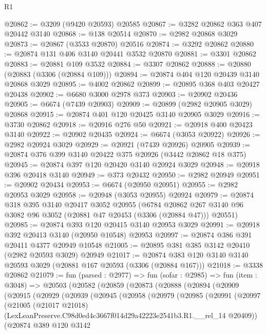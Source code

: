 \begin{lexlean}{R1}
\begin{coremodule}
@20862 := @3209 (@9420 @20593) @20585
@20867 := @3282 @20862 @363 @407 @20442 @3140
@20868 := @138 @20514
@20870 := @2982 @20868 @3029
@20873 := @20867 (@3533 @20870) @20516
@20874 := @3292 @20862
@20880 := @20874 @131 @406 @3140 @20441 @3532 @20870
@20881 := @3301 @20862
@20883 := @20881 @109 @3532
@20884 := @3307 @20862
@20888 := @20880 (@20883 (@3306 (@20884 @109)))
@20894 := @20874 @404 @120 @20439 @3140 @20868 @3029
@20895 := @4002 @20862
@20899 := @20895 @368 @403 @20427 @20438
@20902 := @6680 @3000 @2978 @373
@20903 := @20902 @20436
@20905 := @6674 (@7439 @20903)
@20909 := @20899 (@2982 @20905 @3029) @20868
@20915 := @20874 @401 @120 @20425 @3140 @20905 @3029
@20916 := @3730 @20862
@20918 := @20916 @276 @50
@20921 := @20918 @400 @20423 @3140
@20922 := @20902 @20435
@20924 := @6674 (@3053 @20922)
@20926 := @2982 @20924 @3029
@20929 := @20921 (@7439 @20926) @20905
@20939 := @20874 @376 @399 @3140 @20422 @375 @20926 (@3442 @20862 @18 @375)
@20945 := @20874 @397 @120 @20420 @3140 @20924 @3029
@20948 := @20918 @396 @20418 @3140
@20949 := @373 @20432
@20950 := @2982 @20949
@20951 := @20902 @20434
@20953 := @6674 (@20950 @20951)
@20955 := @2982 @20953 @3029
@20958 := @20948 (@3053 @20955) @20924
@20979 := @20874
    @318
    @395
    @3140
    @20417
    @3052
    @20955
    (@6784 @20862 @267 @3140 @96 @3082 @96 @3052 (@20881 @47 @20453 (@3306 (@20884 @47))) @20551)
@20985 := @20874 @393 @120 @20415 @3140 @20953 @3029
@20991 := @20918 @392 @20413 @3140 (@20950 @10548) @20953
@20997 := @20874 @386 @391 @20411 @4377 @20949 @10548
@21005 := @20895 @381 @385 @3142 @20410 (@2982 @20593 @3029) @20949
@21017 := @20874 @383 @120 @3140 @3140 @20593 @3029 (@20881 @167 @20593 (@3306 (@20884 @167)))
@21018 := @3338 @20862
@21079 := fun (parsed : @2977) =>
  fun (sofar : @2985) =>
  fun (item : @3048) =>
  @20503
    (@20582
      (@20859
        (@20873
          (@20888
            (@20894
              (@20909
                (@20915
                  (@20929
                    (@20939
                      (@20945
                        (@20958
                          (@20979
                            (@20985
                              (@20991
                                (@20997
                                  (@21005
                                    (@21017 @21018)
                                    (LexLeanPreserve.C98d0ed4c3667f014d29a42223e2541b3.R1.__rel_14
                                      @20409))
                                  (@20874
                                    @389
                                    @120
                                    @3142

\end{coremodule}
\end{lexlean}

